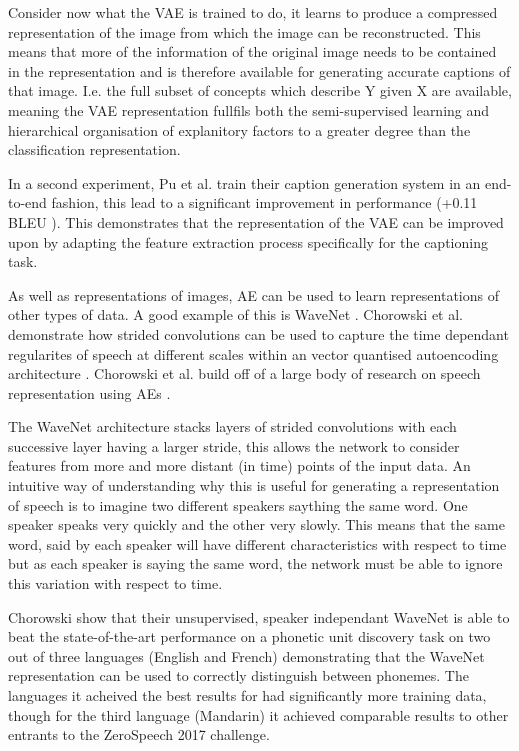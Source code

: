Consider now what the \ac{VAE} is trained to do, it learns to produce a compressed representation of the image from which the image can be reconstructed. This means that more of the information of the original image needs to be contained in the representation and is therefore available for generating accurate captions of that image. I.e. the full subset of concepts which describe Y given X are available, meaning the \ac{VAE} representation fullfils both the semi-supervised learning and hierarchical organisation of explanitory factors to a greater degree than the classification representation.

In a second experiment, Pu et al. train their caption generation system in an end-to-end fashion, this lead to a significant improvement in performance (+0.11 BLEU \cite{bleu}). This demonstrates that the representation of the \ac{VAE} can be improved upon by adapting the feature extraction process specifically for the captioning task.


As well as representations of images, \ac{AE} can be used to learn representations of other types of data. A good example of this is WaveNet \cite{wavenet}. Chorowski et al. demonstrate how strided convolutions \cite{radford2015unsupervised} can be used to capture the time dependant regularites of speech at different scales within an vector quantised autoencoding architecture \cite{van2017neural}. Chorowski et al. build off of a large body of research on speech representation using \ac{AE}s \cite{vincent2010stacked, lu2013speech}.

The WaveNet architecture stacks layers of strided convolutions with each successive layer having a larger stride, this allows the network to consider features from more and more distant (in time) points of the input data. An intuitive way of understanding why this is useful for generating a representation of speech is to imagine two different speakers saything the same word. One speaker speaks very quickly and the other very slowly. This means that the same word, said by each speaker will have different characteristics with respect to time but as each speaker is saying the same word, the network must be able to ignore this variation with respect to time.

Chorowski show that their unsupervised, speaker independant WaveNet is able to beat the state-of-the-art performance on a phonetic unit discovery task \cite{dunbar2017zero} on two out of three languages (English and French) demonstrating that the WaveNet representation can be used to correctly distinguish between phonemes. The languages it acheived the best results for had significantly more training data, though for the third language (Mandarin) it achieved comparable results to other entrants to the ZeroSpeech 2017 challenge. 

